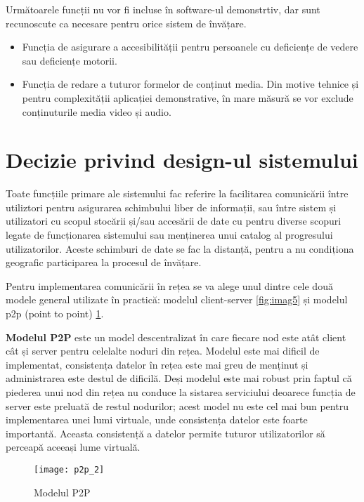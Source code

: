 \par Următoarele funcții nu vor fi incluse în software-ul demonstrtiv, dar sunt recunoscute ca necesare pentru orice sistem de învățare.

\begin{itemize}
\item Funcția de asigurare a accesibilității pentru persoanele cu deficiențe de vedere sau deficiențe motorii.
\item Funcția de redare a tuturor formelor de conținut media. Din motive tehnice și pentru complexității aplicației demonstrative, în mare măsură se vor exclude conținuturile media video și audio.
\end{itemize}

\section{Decizie privind design-ul sistemului}

\par Toate funcțiile primare ale sistemului fac referire la facilitarea comunicării între utiliztori pentru asigurarea schimbului liber de informații, sau între sistem și utilizatori cu scopul stocării și/sau accesării de date cu pentru diverse scopuri legate de funcționarea sistemului sau menținerea unui catalog al progresului utilizatorilor. Aceste schimburi de date se fac la distanță, pentru a nu condiționa geografic participarea la procesul de învățare.
\par Pentru implementarea comunicării în rețea se va alege unul dintre cele două modele general utilizate în practică: modelul client-server \ref{fig:imag5} și modelul p2p (point to point) \ref{fig:imag4}.

\par \textbf{Modelul P2P} este un model descentralizat în care fiecare nod este atât client cât și server pentru celelalte noduri din rețea. Modelul este mai dificil de implementat, consistența datelor în rețea este mai greu de menținut și administrarea este destul de dificilă. Deși modelul este mai robust prin faptul că piederea unui nod din rețea nu conduce la sistarea serviciului deoarece funcția de server este preluată de restul nodurilor; acest model nu este cel mai bun pentru implementarea unei lumi virtuale, unde consistența datelor este foarte importantă. Aceasta consistență a datelor permite tuturor utilizatorilor să perceapă aceeași lume virtuală. 

\begin{figure}[h]
    \centering
    \texttt{[image: p2p\_2]}
    \caption{Modelul P2P}
    \label{fig:imag4}
\end{figure}

